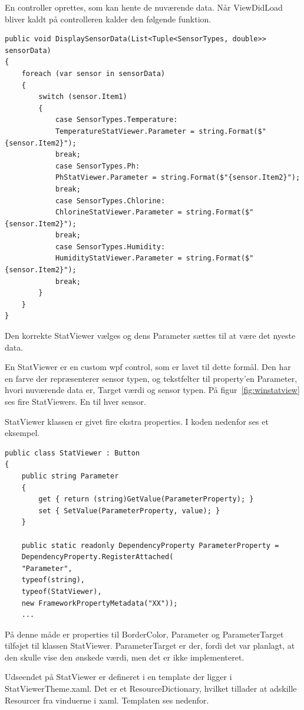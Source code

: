En controller oprettes, som kan hente de nuværende data. Når ViewDidLoad bliver kaldt på controlleren kalder den følgende funktion.

\begin{lstlisting}[caption=DisplaySensorData(),label=code:DisplaySensorData]
public void DisplaySensorData(List<Tuple<SensorTypes, double>> sensorData)
{
   	foreach (var sensor in sensorData)
   	{
   		switch (sensor.Item1)
   		{
   			case SensorTypes.Temperature:
   			TemperatureStatViewer.Parameter = string.Format($"{sensor.Item2}");
   			break;
   			case SensorTypes.Ph:
   			PhStatViewer.Parameter = string.Format($"{sensor.Item2}");
   			break;
   			case SensorTypes.Chlorine:
   			ChlorineStatViewer.Parameter = string.Format($"{sensor.Item2}");
   			break;
   			case SensorTypes.Humidity:
   			HumidityStatViewer.Parameter = string.Format($"{sensor.Item2}");
   			break;
   		} 
   	}
}
\end{lstlisting}

Den korrekte StatViewer vælges og dens Parameter sættes til at være det nyeste data.

En StatViewer er en custom wpf control, som er lavet til dette formål. Den har en farve der repræsenterer sensor typen, og tekstfelter til property'en Parameter, hvori nuværende data er, Target værdi og sensor typen. 
På figur~\ref{fig:winstatview} ses fire StatViewers. En til hver sensor. 

StatViewer klassen er givet fire ekstra properties. I koden nedenfor ses et eksempel.

\begin{lstlisting}[caption=StatViewer attatched property, label=code:StatViewer]
public class StatViewer : Button
{
	public string Parameter
	{
		get { return (string)GetValue(ParameterProperty); }
		set { SetValue(ParameterProperty, value); }
	}
	
	public static readonly DependencyProperty ParameterProperty =
	DependencyProperty.RegisterAttached(
	"Parameter",
	typeof(string),
	typeof(StatViewer),
	new FrameworkPropertyMetadata("XX"));
	...
\end{lstlisting}

På denne måde er properties til BorderColor, Parameter og ParameterTarget tilføjet til klassen StatViewer. ParameterTarget er der, fordi det var planlagt, at den skulle vise den ønskede værdi, men det er ikke implementeret.

Udseendet på StatViewer er defineret i en template der ligger i StatViewerTheme.xaml. Det er et ResourceDictionary, hvilket tillader at adskille Resourcer fra vinduerne i xaml.
Templaten ses nedenfor.

